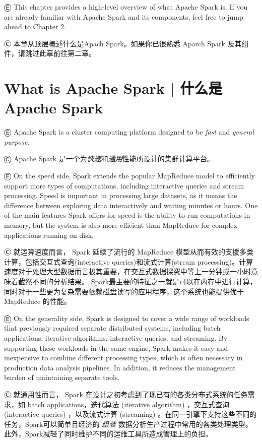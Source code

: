 

Ⓔ \textcolor{etc}{This chapter provides a high-level overview of what Apache Spark is. If you are already familiar with Apache Spark and its components, feel free to jump ahead to Chapter 2.}

Ⓒ 本章从顶层概述什么是Apach Spark。如果你已很熟悉 Aparch Spark
及其组件，请跳过此章前往第二章。


\section{What is Apache Spark  |  什么是 Apache Spark}\label{whatis_apache_spark}

Ⓔ \textcolor{etc}{Apache Spark is a cluster computing platform designed to be
\emph{fast} and \emph{general purpose}.}

Ⓒ Apache Spark
是一个为\emph{快速}和\emph{通用}性能所设计的集群计算平台。

Ⓔ \textcolor{etc}{On the speed side, Spark extends the popular MapReduce model to efficiently support more types of computations, including interactive queries and stream processing. Speed is important in processing large datasets, as it means the difference between exploring data interactively and waiting minutes or hours. One of the main features Spark offers for speed is the ability to run computations in memory, but the system is also more efficient than MapReduce for complex applications running on disk.}

Ⓒ 就运算速度而言， Spark 延续了流行的 MapReduce 模型从而有效的支援多类计算，包括交互式查询(interactive queries)和流式计算(stream processing)。计算速度对于处理大型数据而言极其重要，在交互式数据探究中等上一分钟或一小时意味着截然不同的分析结果。 Spark最主要的特征之一就是可以在内存中进行计算，同时对于一些更为复杂需要依赖磁盘读写的应用程序，这个系统也能提供优于
MapReduce 的性能。

Ⓔ \textcolor{etc}{On the generality side, Spark is designed to cover a wide range of workloads that previously required separate distributed systems, including batch applications, iterative algorithms, interactive queries, and streaming. By supporting these workloads in the same engine, Spark makes it easy and inexpensive to combine different processing types, which is often necessary in production data analysis pipelines. In addition, it reduces the management burden of maintaining separate tools.}

Ⓒ 就通用性而言， Spark 在设计之初考虑到了现已有的各类分布式系统的任务需求，如 batch applications，迭代算法 (iterative algorithm) ，交互式查询 (interactive queries) ，以及流式计算 (streaming) 。在同一引擎下支持这些不同的任务，Spark可以简单且经济的 \emph{组装} 数据分析生产过程中常用的各类处理类型。此外，Spark减轻了同时维护不同的运维工具所造成管理上的负担。

